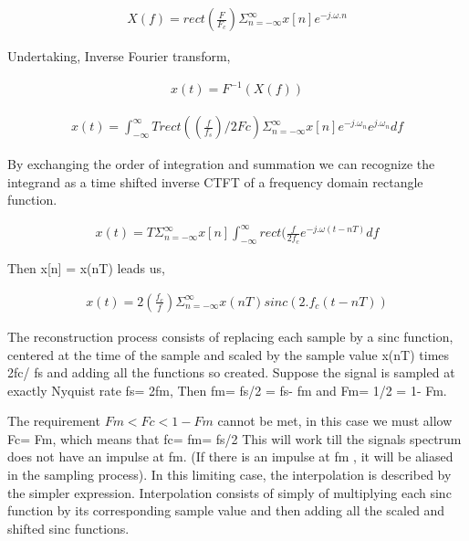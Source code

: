 \documentclass{article}
\begin{document}
\begin{equation}
\begin{aligned}
    X(f) = rect(\frac{F}{F_c})  \Sigma_{n = -\infty}^{\infty} x[n] e^{-j.\omega.n}
\end{aligned}
\end{equation}

Undertaking, Inverse Fourier transform,

\begin{equation}
\begin{aligned}
    x(t) = F^{-1}(X(f)) 
\end{aligned}
\end{equation}


\begin{equation}
\begin{aligned}
     x(t) = \int_{-\infty}^{\infty} T rect((\frac{f}{f_s})/2Fc) \Sigma_{n = -\infty}^{\infty} x[n] e^{-j.\omega_n} e^{j.\omega_n} df
\end{aligned}
\end{equation}

By exchanging the order of integration and summation we can recognize the integrand as a time shifted inverse CTFT of a frequency domain rectangle function.

\begin{equation}
\begin{aligned}
    x(t) = T \Sigma_{n = -\infty}^{\infty} x[n] \int_{ -\infty}^{\infty} rect(\frac{f}{2f_c} e^{-j.\omega(t-nT)} df
\end{aligned}
\end{equation}

Then x[n] = x(nT) leads us, 

\begin{equation}
\begin{aligned}
    x(t) = 2(\frac{f_c}{f})  \Sigma_{n = -\infty}^{\infty} x(nT) sinc(2.f_c(t-nT))
\end{aligned}
\end{equation}

\cite{b3} The reconstruction process consists of replacing each sample by a sinc function, centered at the time of the sample and scaled by the sample value x(nT) times 2fc/ fs and adding all the functions so created. Suppose the signal is sampled at exactly Nyquist rate fs= 2fm, Then fm= fs/2 = fs- fm and Fm= 1/2 = 1- Fm.

The requirement $  Fm < Fc < 1- Fm $ cannot be met, in this case we must allow Fc= Fm, which means that fc= fm= fs/2 This will work till the signals spectrum does not have an impulse at fm. (If there is an impulse at fm , it will be aliased in the sampling process). In this limiting case, the interpolation is described by the simpler expression. Interpolation consists of simply of multiplying each sinc function by its corresponding sample value and then adding all the scaled and shifted sinc functions. 
\end{document}

